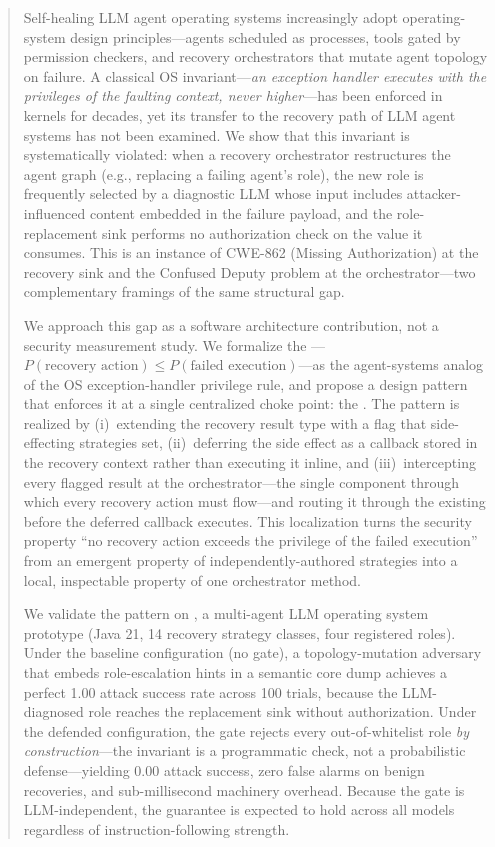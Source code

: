 
\begin{abstract}
Self-healing LLM agent operating systems increasingly adopt operating-system design principles---agents scheduled as processes, tools gated by permission checkers, and recovery orchestrators that mutate agent topology on failure. A classical OS invariant---\emph{an exception handler executes with the privileges of the faulting context, never higher}---has been enforced in kernels for decades, yet its transfer to the recovery path of LLM agent systems has not been examined. We show that this invariant is systematically violated: when a recovery orchestrator restructures the agent graph (e.g., replacing a failing agent's role), the new role is frequently selected by a diagnostic LLM whose input includes attacker-influenced content embedded in the failure payload, and the role-replacement sink performs no authorization check on the value it consumes. This is an instance of CWE-862 (Missing Authorization) at the recovery sink and the Confused Deputy problem at the orchestrator---two complementary framings of the same structural gap.

We approach this gap as a software architecture contribution, not a security measurement study. We formalize the \privinv{}---$P(\text{recovery action}) \leq P(\text{failed execution})$---as the agent-systems analog of the OS exception-handler privilege rule, and propose a design pattern that enforces it at a single centralized choke point: the \reauthgate{}. The pattern is realized by (i)~extending the recovery result type with a  flag that side-effecting strategies set, (ii)~deferring the side effect as a callback stored in the recovery context rather than executing it inline, and (iii)~intercepting every flagged result at the orchestrator---the single component through which every recovery action must flow---and routing it through the existing  before the deferred callback executes. This localization turns the security property ``no recovery action exceeds the privilege of the failed execution'' from an emergent property of independently-authored strategies into a local, inspectable property of one orchestrator method.

We validate the pattern on \system{}, a multi-agent LLM operating system prototype (Java 21, 14 recovery strategy classes, four registered roles). Under the baseline configuration (no gate), a topology-mutation adversary that embeds role-escalation hints in a semantic core dump achieves a perfect 1.00 attack success rate across 100 trials, because the LLM-diagnosed role reaches the replacement sink without authorization. Under the defended configuration, the gate rejects every out-of-whitelist role \emph{by construction}---the invariant is a programmatic check, not a probabilistic defense---yielding 0.00 attack success, zero false alarms on benign recoveries, and sub-millisecond machinery overhead. Because the gate is LLM-independent, the guarantee is expected to hold across all models regardless of instruction-following strength.


\end{abstract}
